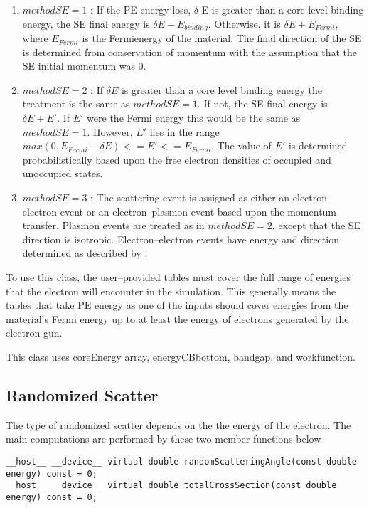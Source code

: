 \begin{enumerate}
    \item $methodSE=1$ \cite{ding1996monte}: If the PE energy loss, $\delta$ E is greater than a core level binding energy, the SE final energy is $\delta E-E_{binding}$. Otherwise, it is $\delta E + E_{Fermi}$, where $E_{Fermi}$ is the Fermienergy of the material. The final direction of the SE is determined from conservation of momentum with the assumption that the SE initial momentum was 0.
    \item $methodSE=2$ \cite{ding2001monte}: If $\delta E$ is greater than a core level binding energy the treatment is the same as $methodSE=1$. If not, the SE final energy is $\delta E + E'$. If $E'$ were the Fermi energy this would be the same as $methodSE = 1$. However, $E'$ lies in the range $max(0, E_{Fermi} - \delta E) <= E' <= E_{Fermi}$. The value of $E'$ is determined probabilistically based upon the free electron densities of occupied and unoccupied states.
    \item $methodSE=3$ \cite{mao2008electron}: The scattering event is assigned as either an electron--electron event or an electron--plasmon event based upon the momentum transfer. Plasmon events are treated as in $methodSE = 2$, except that the SE direction is isotropic. Electron--electron events have energy and direction determined as described by \cite{mao2008electron}.
\end{enumerate}

To use this class, the user--provided tables must cover the full range of energies that the electron will encounter in the simulation. This generally means the tables that take PE energy as one of the inputs should cover energies from the material's Fermi energy up to at least the energy of electrons generated by the electron gun.

This class uses coreEnergy array, energyCBbottom, bandgap, and workfunction.

\subsection{Randomized Scatter}
The type of randomized scatter depends on the the energy of the electron. The main computations are performed by these two member functions below

\begin{lstlisting}
__host__ __device__ virtual double randomScatteringAngle(const double energy) const = 0;
__host__ __device__ virtual double totalCrossSection(const double energy) const = 0;
\end{lstlisting}

